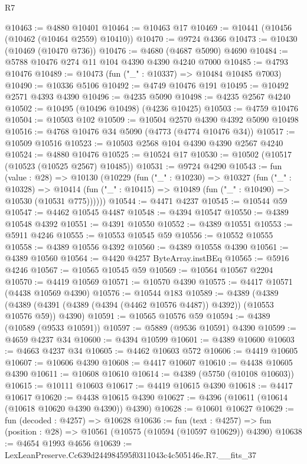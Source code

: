 \begin{lexlean}{R7}
\begin{coremodule}
@10463 := @4880 @10401
@10464 := @10463 @17
@10469 := @10441 (@10456 (@10462 (@10464 @2559) @10410))
@10470 := @9724 @4366
@10473 := @10430 (@10469 (@10470 @736))
@10476 := @4680 (@4687 @5090) @4690
@10484 := @5788 @10476 @274 @11 @104 @4390 @4390 @4240 @7000
@10485 := @4793 @10476
@10489 := @10473 (fun ("_" : @10337) => @10484 @10485 @7003)
@10490 := @10336 @5106
@10492 := @4749 @10476 @191
@10495 := @10492 @2571 @4393 @4390
@10496 := @4235 @5090
@10498 := @4235 @2567 @4240
@10502 := @10495 (@10496 @10498) (@4236 @10425)
@10503 := @4759 @10476
@10504 := @10503 @102
@10509 := @10504 @2570 @4390 @4392 @5090 @10498
@10516 := @4768 @10476 @34 @5090 (@4773 (@4774 @10476 @34))
@10517 := @10509 @10516
@10523 := @10503 @2568 @104 @4390 @4390 @2567 @4240
@10524 := @4880 @10476
@10525 := @10524 @17
@10530 := @10502 (@10517 (@10523 (@10525 @2567) @10485))
@10531 := @9724 @4290
@10543 := fun (value : @28) =>
  @10130
    (@10229
      (fun ("_" : @10230) =>
      @10327
        (fun ("_" : @10328) =>
        @10414 (fun ("_" : @10415) => @10489 (fun ("_" : @10490) => @10530 (@10531 @775))))))
@10544 := @4471 @4237
@10545 := @10544 @59
@10547 := @4462 @10545 @4487
@10548 := @4394 @10547
@10550 := @4389 @10548 @4392
@10551 := @4391 @10550
@10552 := @4389 @10551
@10553 := @5911 @4246
@10555 := @10553 @10545 @59
@10556 := @10552 @10555
@10558 := @4389 @10556 @4392
@10560 := @4389 @10558 @4390
@10561 := @4389 @10560
@10564 := @4420 @4257 ByteArray.instBEq
@10565 := @5916 @4246
@10567 := @10565 @10545 @59
@10569 := @10564 @10567 @2204
@10570 := @4419 @10569
@10571 := @10570 @4390
@10575 := @4417 @10571 (@4438 @10569 @4390)
@10576 := @10544 @183
@10589 := @4389
    (@4389 (@4389 (@4391 (@4389 (@4394 (@4462 @10576 @4487)) @4392)) (@10553 @10576 @59)) @4390)
@10591 := @10565 @10576 @59
@10594 := @4389 (@10589 (@9533 @10591))
@10597 := @5889 (@9536 @10591) @4390
@10599 := @4659 @4237 @34
@10600 := @4394 @10599
@10601 := @4389 @10600
@10603 := @4663 @4237 @34
@10605 := @4462 @10603 @572
@10606 := @4419 @10605
@10607 := @10606 @4390
@10608 := @4417 @10607
@10610 := @4438 @10605 @4390
@10611 := @10608 @10610
@10614 := @4389 (@5750 (@10108 @10603))
@10615 := @10111 @10603
@10617 := @4419 @10615 @4390
@10618 := @4417 @10617
@10620 := @4438 @10615 @4390
@10627 := @4396 (@10611 (@10614 (@10618 @10620 @4390 @4390)) @4390)
@10628 := @10601 @10627
@10629 := fun (decoded : @4257) => @10628
@10636 := fun (text : @4257) =>
  fun (position : @28) => @10561 (@10575 (@10594 (@10597 @10629)) @4390)
@10638 := @4654 @1993 @4656
@10639 := LexLeanPreserve.Cc639d244984595f0311043c4c505146e.R7.__fits_37

\end{coremodule}
\end{lexlean}
